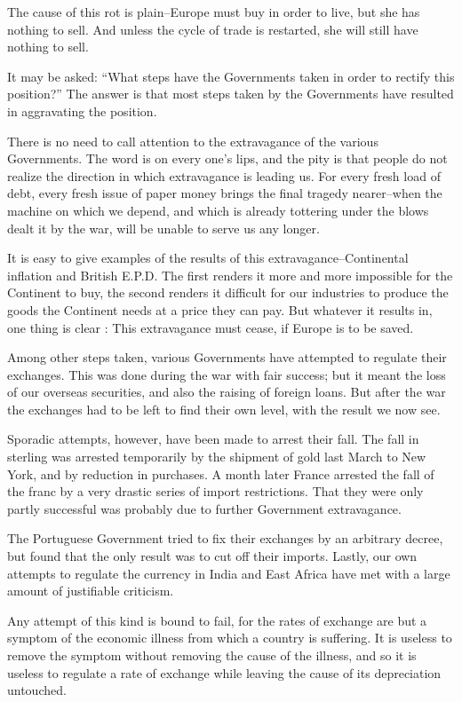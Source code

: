 \documentclass{book}
\begin{document}
The cause of this rot is plain–Europe must buy in order to live, but she has nothing to sell. And unless the cycle of trade is restarted, she will still have nothing to sell.

It may be asked: “What steps have the Governments taken in order to rectify this position?” The answer is that most steps taken by the Governments have resulted in aggravating the position.

There is no need to call attention to the extravagance of the various Governments. The word is on every one’s lips, and the pity is that people do not realize the direction in which extravagance is leading us. For every fresh load of debt, every fresh issue of paper money brings the final tragedy nearer–when the machine on which we depend, and which is already tottering under the blows dealt it by the war, will be unable to serve us any longer.

It is easy to give examples of the results of this extravagance–Continental inflation and British E.P.D. The first renders it more and more impossible for the Continent to buy, the second renders it difficult for our industries to produce the goods the Continent needs at a price they can pay. But whatever it results in, one thing is clear : This extravagance must cease, if Europe is to be saved.

Among other steps taken, various Governments have attempted to regulate their exchanges. This was done during the war with fair success; but it meant the loss of our overseas securities, and also the raising of foreign loans. But after the war the exchanges had to be left to find their own level, with the result we now see.

Sporadic attempts, however, have been made to arrest their fall. The fall in sterling was arrested temporarily by the shipment of gold last March to New York, and by reduction in purchases. A month later France arrested the fall of the franc by a very drastic series of import restrictions. That they were only partly successful was probably due to further Government extravagance.

The Portuguese Government tried to fix their exchanges by an arbitrary decree, but found that the only result was to cut off their imports. Lastly, our own attempts to regulate the currency in India and East Africa have met with a large amount of justifiable criticism.

Any attempt of this kind is bound to fail, for the rates of exchange are but a symptom of the economic illness from which a country is suffering. It is useless to remove the symptom without removing the cause of the illness, and so it is useless to regulate a rate of exchange while leaving the cause of its depreciation untouched.
\end{document}
